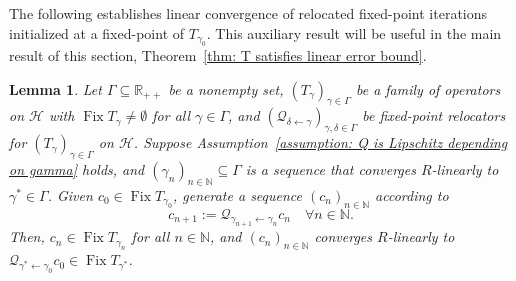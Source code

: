 \documentclass[a4paper,12pt]{article}
\newtheorem{lemma}[theorem]{Lemma}
\DeclareMathOperator{\Fix}{Fix}
\begin{document}
The following establishes linear convergence of relocated fixed-point iterations initialized at a fixed-point of $T_{\gamma_0}$. This auxiliary result will be useful in the main result of this section, Theorem~\ref{thm: T satisfies linear error bound}. 


\begin{lemma}\label{Lemma: c_n coverges linearly to c}
    Let $\Gamma\subseteq\mathbb{R}_{++}$ be a nonempty set, $(T_\gamma)_{\gamma\in\Gamma}$ be a family of operators on $\mathcal{H}$ with $\Fix T_{\gamma}\neq\emptyset$ for all $\gamma\in\Gamma$, and $(\mathcal{Q}_{\delta\leftarrow\gamma})_{\gamma,\delta\in\Gamma}$ be fixed-point relocators  for $(T_\gamma)_{\gamma\in\Gamma}$ on $\mathcal{H}$. Suppose Assumption~\ref{assumption: Q is Lipschitz depending on gamma} holds, and $(\gamma_n)_{n\in\mathbb{N}}\subseteq\Gamma$ is a sequence that converges $R$-linearly to $\gamma^*\in\Gamma$.
    Given $c_0\in\Fix T_{\gamma_0}$, generate a sequence $(c_n)_{n\in\mathbb{N}}$ according to
    \begin{equation}\label{eq-NDR:iteration for fixed-point relocator}
c_{n+1}:=\mathcal{Q}_{\gamma_{n+1}\leftarrow\gamma_n}c_n %
\quad \forall n\in\mathbb{N}.
    \end{equation}
   Then, $c_n\in\Fix T_{\gamma_n}$ for all $n\in\mathbb{N}$, and $(c_n)_{n\in\mathbb{N}}$ converges $R$-linearly to $\mathcal{Q}_{\gamma^*\leftarrow\gamma_0}c_0\in\Fix T_{\gamma^*}$.
\end{lemma}
\end{document}
